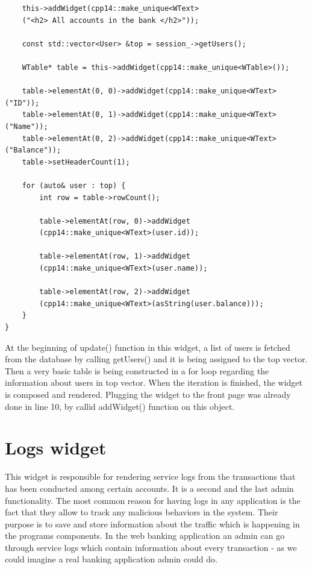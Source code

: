 \documentclass[a4paper,12pt]{book}
\begin{document}
{{\begin{lstlisting}
    this->addWidget(cpp14::make_unique<WText>
    ("<h2> All accounts in the bank </h2>"));

    const std::vector<User> &top = session_->getUsers();

    WTable* table = this->addWidget(cpp14::make_unique<WTable>());

    table->elementAt(0, 0)->addWidget(cpp14::make_unique<WText>("ID"));
    table->elementAt(0, 1)->addWidget(cpp14::make_unique<WText>("Name"));
    table->elementAt(0, 2)->addWidget(cpp14::make_unique<WText>("Balance"));
    table->setHeaderCount(1);

    for (auto& user : top) {
        int row = table->rowCount();

        table->elementAt(row, 0)->addWidget
        (cpp14::make_unique<WText>(user.id));
        
        table->elementAt(row, 1)->addWidget
        (cpp14::make_unique<WText>(user.name));
        
        table->elementAt(row, 2)->addWidget
        (cpp14::make_unique<WText>(asString(user.balance)));
    }
}
\end{lstlisting}

At the beginning of update() function in this widget, a list of users is fetched from the database by calling getUsers() and it is being assigned to the top vector. Then a very basic table is being constructed in a for loop regarding the information about users in top vector. When the iteration is finished, the widget is composed and rendered. Plugging the widget to the front page was already done in line 10, by callid addWidget() function on this object.
}

\section*{Logs widget}
{
This widget is responsible for rendering service logs from the transactions that has been conducted among certain accounts. It is a second and the last admin functionality. The most common reason for having logs in any application is the fact that they allow to track any malicious behaviors in the system. Their purpose is to save and store information about the traffic which is happening in the programs components. In the web banking application an admin can go through service logs which contain information about every transaction - as we could imagine a real banking application admin could do.

}}
\end{document}
